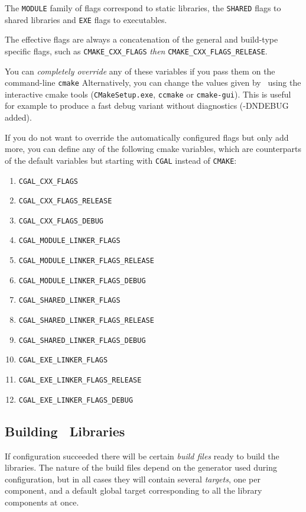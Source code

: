 The \texttt{MODULE} family of flags correspond to static libraries, the \texttt{SHARED} flags to shared libraries
and \texttt{EXE} flags to executables.

The effective flags are always a concatenation of the general and build-type specific flags, such as
\texttt{CMAKE\_CXX\_FLAGS} {\em then} \texttt{CMAKE\_CXX\_FLAGS\_RELEASE}.

You can {\em completely override} any of these variables if you pass them on the command-line \texttt{cmake}
Alternatively, you can change the values given by \cmake\ using the
interactive cmake tools (\texttt{CMakeSetup.exe}, \texttt{ccmake} or \texttt{cmake-gui}).  This is useful for example to produce a fast debug
variant without diagnostics (-DNDEBUG added). 

If you do not want to override the automatically configured flags but only add more, you can 
define any of the following cmake variables, which are counterparts of the default
variables but starting with \texttt{CGAL} instead of \texttt{CMAKE}:

\begin{enumerate}
\item \texttt{CGAL\_CXX\_FLAGS}
\item \texttt{CGAL\_CXX\_FLAGS\_RELEASE}
\item \texttt{CGAL\_CXX\_FLAGS\_DEBUG}
\item \texttt{CGAL\_MODULE\_LINKER\_FLAGS}
\item \texttt{CGAL\_MODULE\_LINKER\_FLAGS\_RELEASE}
\item \texttt{CGAL\_MODULE\_LINKER\_FLAGS\_DEBUG}
\item \texttt{CGAL\_SHARED\_LINKER\_FLAGS}
\item \texttt{CGAL\_SHARED\_LINKER\_FLAGS\_RELEASE}
\item \texttt{CGAL\_SHARED\_LINKER\_FLAGS\_DEBUG}
\item \texttt{CGAL\_EXE\_LINKER\_FLAGS}
\item \texttt{CGAL\_EXE\_LINKER\_FLAGS\_RELEASE}
\item \texttt{CGAL\_EXE\_LINKER\_FLAGS\_DEBUG}
\end{enumerate}


\subsection{Building \cgal\ Libraries}

If configuration succeeded there will be certain {\em build files} ready to build the libraries.
The nature of the build files depend on the generator used during configuration, but in all cases they 
will contain several {\em targets}, one per component,  and a default global target corresponding 
to all the library components at once.

